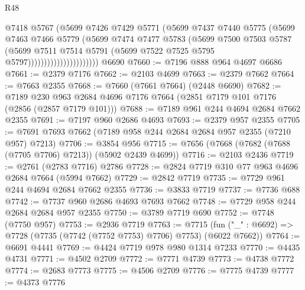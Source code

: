 \begin{lexlean}{R48}
\begin{coremodule}
                                  @7418
                                  @5767
                                  (@5699
                                    @7426
                                    @7429
                                    @5771
                                    (@5699
                                      @7437
                                      @7440
                                      @5775
                                      (@5699
                                        @7463
                                        @7466
                                        @5779
                                        (@5699
                                          @7474
                                          @7477
                                          @5783
                                          (@5699
                                            @7500
                                            @7503
                                            @5787
                                            (@5699
                                              @7511
                                              @7514
                                              @5791
                                              (@5699 @7522 @7525 @5795 @5797))))))))))))))))))))))
    @6690
@7660 := @7196 @888 @964 @4697 @6686
@7661 := @2379 @7176
@7662 := @2103 @4699
@7663 := @2379 @7662
@7664 := @7663 @2355
@7668 := @7660 (@7661 @7664) (@2448 @6690)
@7682 := @7189 @230 @963 @2684 @4696 @7176 @7664 (@2851 @7179 @101 @7176 (@2856 (@2857 @7179 @101)))
@7688 := @7189 @961 @244 @4694 @2684 @7662 @2355
@7691 := @7197 @960 @2686 @4693
@7693 := @2379 @957 @2355
@7705 := @7691 @7693 @7662 (@7189 @958 @244 @2684 @2684 @957 @2355 (@7210 @957) @7213)
@7706 := @3854 @956
@7715 := @7656 (@7668 (@7682 (@7688 (@7705 @7706) @7213)) (@5902 @2439 @4699))
@7716 := @2103 @2436
@7719 := @2761 (@2783 @7716) @2786
@7728 := @2824 @7719 @310 @77 @963 @4696 @2684 @7664 (@5994 @7662)
@7729 := @2842 @7719
@7735 := @7729 @961 @244 @4694 @2684 @7662 @2355
@7736 := @3833 @7719
@7737 := @7736 @688
@7742 := @7737 @960 @2686 @4693 @7693 @7662
@7748 := @7729 @958 @244 @2684 @2684 @957 @2355
@7750 := @3789 @7719 @690
@7752 := @7748 (@7750 @957)
@7753 := @2936 @7719
@7763 := @7715 (fun ("_" : @6692) => @7728 (@7735 (@7742 (@7752 @7753) @7706) @7753) (@6022 @7662))
@7764 := @6691 @4441
@7769 := @4424 @7719 @978 @980 @1314 @7233
@7770 := @4435 @4731
@7771 := @4502 @2709
@7772 := @7771 @4739
@7773 := @4738 @7772
@7774 := @2683 @7773
@7775 := @4506 @2709
@7776 := @7775 @4739
@7777 := @4373 @7776

\end{coremodule}
\end{lexlean}
